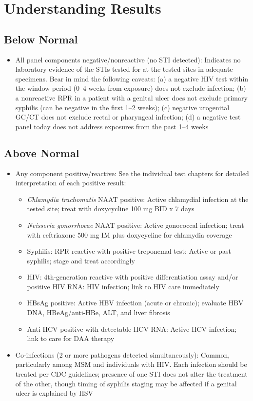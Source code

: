 \section*{Understanding Results}

\subsection*{Below Normal}
\begin{itemize}
  \item All panel components negative/nonreactive (no STI detected): Indicates no laboratory evidence of the STIs tested for at the tested sites in adequate specimens. Bear in mind the following caveats: (a) a negative HIV test within the window period (0--4 weeks from exposure) does not exclude infection; (b) a nonreactive RPR in a patient with a genital ulcer does not exclude primary syphilis (can be negative in the first 1--2 weeks); (c) negative urogenital GC/CT does not exclude rectal or pharyngeal infection; (d) a negative test panel today does not address exposures from the past 1--4 weeks
\end{itemize}

\subsection*{Above Normal}
\begin{itemize}
  \item Any component positive/reactive: See the individual test chapters for detailed interpretation of each positive result:
    \begin{itemize}
      \item \textit{Chlamydia trachomatis} NAAT positive: Active chlamydial infection at the tested site; treat with doxycycline 100 mg BID x 7 days
      \item \textit{Neisseria gonorrhoeae} NAAT positive: Active gonococcal infection; treat with ceftriaxone 500 mg IM plus doxycycline for chlamydia coverage
      \item Syphilis: RPR reactive with positive treponemal test: Active or past syphilis; stage and treat accordingly
      \item HIV: 4th-generation reactive with positive differentiation assay and/or positive HIV RNA: HIV infection; link to HIV care immediately
      \item HBsAg positive: Active HBV infection (acute or chronic); evaluate HBV DNA, HBeAg/anti-HBe, ALT, and liver fibrosis
      \item Anti-HCV positive with detectable HCV RNA: Active HCV infection; link to care for DAA therapy
    \end{itemize}
  \item Co-infections (2 or more pathogens detected simultaneously): Common, particularly among MSM and individuals with HIV. Each infection should be treated per CDC guidelines; presence of one STI does not alter the treatment of the other, though timing of syphilis staging may be affected if a genital ulcer is explained by HSV
\end{itemize}

